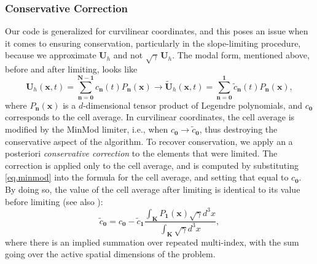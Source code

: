 \documentclass[letterpaper]{jpconf}
\renewcommand{\bs}[1]{\boldsymbol{#1}}
\newcommand{\figref}[1]{Figure~\ref{#1}}
\begin{document}

\subsubsection{Conservative Correction}
Our code is generalized for curvilinear coordinates, and this poses an issue when it comes to ensuring conservation, particularly in the slope-limiting procedure, because we approximate $\bs{U}_{h}$ and not $\sqrt{\gamma}\,\bs{U}_{h}$. The modal form, mentioned above, before and after limiting, looks like
\begin{equation}\label{eq.minmod}
\bs{U}_{h}\left(\bs{x},t\right)=\sum\limits_{\bs{n}=\bs{0}}^{\bs{N}-\bs{1}}c_{\bs{n}}\left(t\right)P_{\bs{n}}\left(\bs{x}\right)\longrightarrow\widetilde{\bs{U}}_{h}\left(\bs{x},t\right)=\sum\limits_{\bs{n}=\bs{0}}^{\bs{1}}\widetilde{c}_{\bs{n}}\left(t\right)P_{\bs{n}}\left(\bs{x}\right),
\end{equation}
where $P_{\bs{n}}\left(\bs{x}\right)$ is a $d$-dimensional tensor product of Legendre polynomials, and $c_{\bs{0}}$ corresponds to the cell average. In curvilinear coordinates, the cell average is modified by the MinMod limiter, i.e., when $c_{\bs{0}}\longrightarrow\widetilde{c}_{\bs{0}}$, thus destroying the conservative aspect of the algorithm. To recover conservation, we apply an a posteriori \textit{conservative correction} to the elements that were limited. The correction is applied only to the cell average, and is computed by substituting \eqref{eq.minmod} into the formula for the cell average, and setting that equal to $c_{\bs{0}}$. By doing so, the value of the cell average after limiting is identical to its value before limiting (see also \cite{RadiceRezzolla2011}):
\begin{equation}
\widetilde{c}_{\bs{0}}=c_{\bs{0}}-\widetilde{c}_{\bs{1}}\frac{\int_{\bs{K}}P_{\bs{1}}\left(\bs{x}\right)\sqrt{\gamma}d^{3}x}{\int_{\bs{K}}\sqrt{\gamma}d^{3}x},
\end{equation}
where there is an implied summation over repeated multi-index, with the sum going over the active spatial dimensions of the problem.
\end{document}
